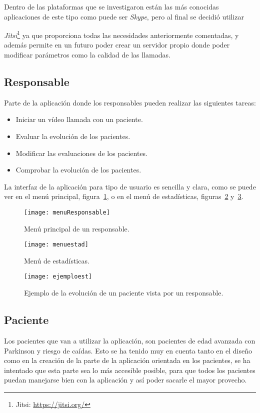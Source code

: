 Dentro de las plataformas que se investigaron están las más conocidas aplicaciones de este tipo como puede ser \textit{Skype}, pero al final se decidió utilizar {\textit{Jitsi}\footnote{Jitsi: \url{https://jitsi.org/}} ya que proporciona todas las necesidades anteriormente comentadas, y además permite en un futuro poder crear un servidor propio donde poder modificar parámetros como la calidad de las llamadas.

\subsection{Responsable}
Parte de la aplicación donde los responsables pueden realizar las siguientes tareas:
\begin{itemize}
	\item Iniciar un vídeo llamada con un paciente.
	\item Evaluar la evolución de los pacientes.
	\item Modificar las evaluaciones de los pacientes.
	\item Comprobar la evolución de los pacientes.
\end{itemize}

La interfaz de la aplicación para tipo de usuario es sencilla y clara, como se puede ver en el menú principal, figura~\ref{fig:menuPaciente}, o en el menú de estadísticas, figuras~\ref{fig:menuest} y~\ref{fig:ejemploest}.

\begin{figure}[h]
	\centering
	\texttt{[image: menuResponsable]}
	\caption{Menú principal de un responsable.}
	\label{fig:menuPaciente}
\end{figure}

\begin{figure}[h]
	\centering
	\texttt{[image: menuestad]}
	\caption{Menú de estadísticas.}
	\label{fig:menuest}
\end{figure}

\begin{figure}[h]
	\centering
	\texttt{[image: ejemploest]}
	\caption{Ejemplo de la evolución de un paciente vista por un responsable.}
	\label{fig:ejemploest}
\end{figure}

\subsection{Paciente}
Los pacientes que van a utilizar la aplicación, son pacientes de edad avanzada con Parkinson y riesgo de caídas. Esto se ha tenido muy en cuenta tanto en el diseño como en la creación de la parte de la aplicación orientada en los pacientes, se ha intentado que esta parte sea lo más accesible posible, para que todos los pacientes puedan manejarse bien con la aplicación y así poder sacarle el mayor provecho.

}
